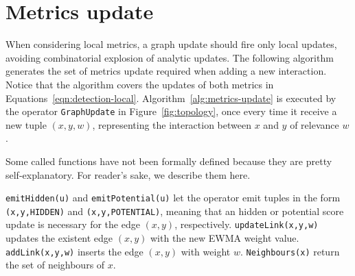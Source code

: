 \section{Metrics update}
\label{sec:metrics-update}

When considering local metrics, a graph update should fire only local updates, avoiding combinatorial explosion of analytic updates.
The following algorithm generates the set of metrics update required when adding a new interaction.
Notice that the algorithm covers the updates of both metrics in Equations~\ref{eqn:detection-local}. 
Algorithm~\ref{alg:metrics-update} is executed by the operator \texttt{GraphUpdate} in Figure~\ref{fig:topology}, once every time it receive a new tuple $(x,y,w)$, representing the interaction between $x$ and $y$ of relevance $w$.

Some called functions have not been formally defined because they are pretty self-explanatory. For reader's sake, we describe them here. 

\texttt{emitHidden(u)} and \texttt{emitPotential(u)} let the operator emit tuples in the form \texttt{(x,y,HIDDEN)} and \texttt{(x,y,POTENTIAL)}, meaning that an hidden or potential score update is necessary for the edge $(x,y)$, respectively.
\texttt{updateLink(x,y,w)} updates the existent edge $(x,y)$ with the new EWMA weight value. 
\texttt{addLink(x,y,w)} inserts the edge $(x,y)$ with weight $w$. 
\texttt{Neighbours(x)} return the set of neighbours of $x$.


